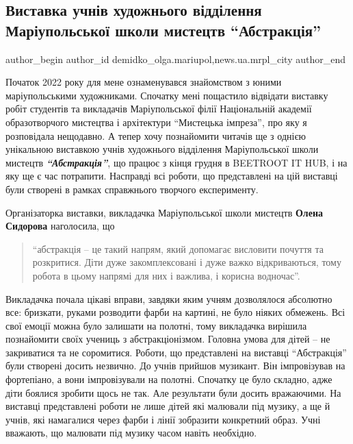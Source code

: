  
 
 
 
 
 
\subsection{Виставка учнів художнього відділення Маріупольської школи мистецтв \enquote{Абстракція}}
\label{sec:16_01_2022.stz.news.ua.mrpl_city.1.vystavka_uchniv_abstrakcia}
 
\ifcmt
 author_begin
   author_id demidko_olga.mariupol,news.ua.mrpl_city
 author_end
\fi

Початок 2022 року для мене ознаменувався знайомством з юними маріупольськими
художниками. Спочатку мені пощастило відвідати виставку робіт студентів та
викладачів Маріупольської філії Національній академії образотворчого мистецтва
і архітектури \enquote{Мистецька імпреза}, про яку я розповідала нещодавно. А тепер
хочу познайомити читачів ще з однією унікальною виставкою учнів художнього
відділення Маріупольської школи мистецтв \emph{\textbf{\enquote{Абстракція}}}, що працює з кінця грудня
в BEETROOT IT HUB, і на яку ще є час потрапити. Насправді всі роботи, що
представлені на цій виставці були створені в рамках справжнього творчого
експерименту.


Організаторка виставки, викладачка Маріупольської школи мистецтв \textbf{Олена Сидорова}
наголосила, що 
\begin{quote}
\enquote{абстракція – це такий напрям, який допомагає висловити почуття
та розкритися. Діти дуже закомплексовані і дуже важко відкриваються, тому
робота в цьому напрямі для них і важлива, і корисна водночас}. 
\end{quote}
Викладачка почала цікаві вправи, завдяки яким учням дозволялося абсолютно все:
бризкати, руками розводити фарби на картині, не було ніяких обмежень. Всі свої
емоції можна було залишати на полотні, тому викладачка вирішила познайомити
своїх учениць з абстракціонізмом. Головна умова для дітей – не закриватися та
не соромитися. Роботи, що представлені на виставці \enquote{Абстракція} були створені
досить незвично. До учнів прийшов музикант. Він імпровізував на фортепіано, а
вони імпровізували на полотні. Спочатку це було складно, адже діти боялися
зробити щось не так. Але результати були досить вражаючими. На виставці
представлені роботи не лише дітей які малювали під музику, а ще й учнів, які
намагалися через фарби і лінії зобразити конкретний образ. Учні вважають, що
малювати під музику часом навіть необхідно.

